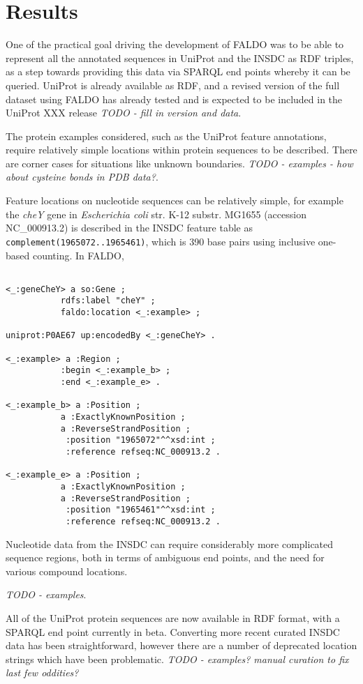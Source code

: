 \section*{Results}
One of the practical goal driving the development of FALDO was to be able
to represent all the annotated sequences in UniProt and the INSDC as RDF
triples, as a step towards providing this data via SPARQL end points whereby
it can be queried.
UniProt is already available as RDF, and a revised version of the full
dataset using FALDO has already tested and is expected to be included
in the UniProt XXX release \textit{TODO - fill in version and data}.

The protein examples considered, such as the UniProt feature annotations,
require relatively simple locations within protein sequences to be described.
There are corner cases for situations like unknown boundaries.
\textit{TODO - examples - how about cysteine bonds in PDB data?}.

Feature locations on nucleotide sequences can be relatively simple,
for example the \textit{cheY} gene in
\textit{Escherichia coli} str. K-12 substr. MG1655 (accession NC\_000913.2)
is described in the INSDC feature table as \texttt{complement(1965072..1965461)},
which is 390 base pairs using inclusive one-based counting. In FALDO,

\begin{verbatim}

<_:geneCheY> a so:Gene ;
           rdfs:label "cheY" ;
           faldo:location <_:example> ;

uniprot:P0AE67 up:encodedBy <_:geneCheY> .

<_:example> a :Region ;
           :begin <_:example_b> ;
           :end <_:example_e> .

<_:example_b> a :Position ; 
           a :ExactlyKnownPosition ;
           a :ReverseStrandPosition ;
            :position "1965072"^^xsd:int ;
            :reference refseq:NC_000913.2 .

<_:example_e> a :Position ; 
           a :ExactlyKnownPosition ;
           a :ReverseStrandPosition ;
            :position "1965461"^^xsd:int ;
            :reference refseq:NC_000913.2 .
\end{verbatim}

Nucleotide data from the INSDC can require considerably more complicated
sequence regions, both in terms of ambiguous end points, and the need for
various compound locations.



\textit{TODO - examples}.

All of the UniProt protein sequences are now available in RDF format,
with a SPARQL end point currently in beta. Converting more recent
curated INSDC data has been straightforward, however there are a
number of deprecated location strings which have been problematic.
\textit{TODO - examples? manual curation to fix last few oddities?}
